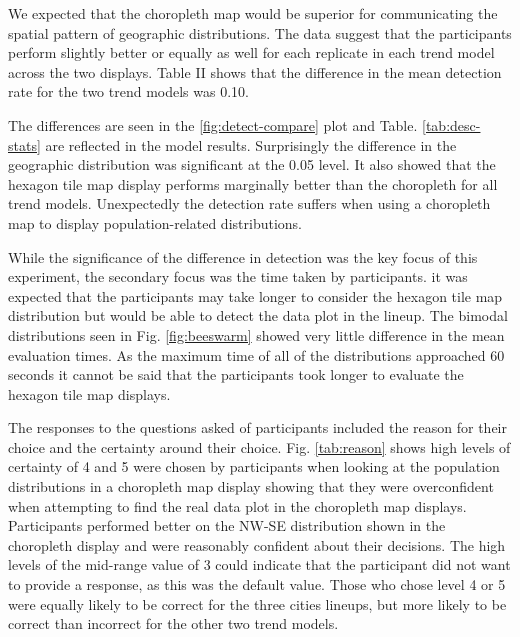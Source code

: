 \documentclass[journal]{vgtc}                     %
\begin{document}
We expected that the choropleth map would be superior for communicating the spatial pattern of geographic distributions. The data suggest that the participants perform slightly better or equally as well for each replicate in each trend model across the two displays. Table II shows that the difference in the mean detection rate for the two trend models was 0.10.

The differences are seen in the \ref{fig:detect-compare} plot and Table. \ref{tab:desc-stats} are reflected in the model results. Surprisingly the difference in the geographic distribution was significant at the 0.05 level.
It also showed that the hexagon tile map display performs marginally better than the choropleth for all trend models. Unexpectedly the detection rate suffers when using a choropleth map to display population-related distributions.

While the significance of the difference in detection was the key focus of this experiment, the secondary focus was the time taken by participants. it was expected that the participants may take longer to consider the hexagon tile map distribution but would be able to detect the data plot in the lineup.
The bimodal distributions seen in Fig. \ref{fig:beeswarm} showed very little difference in the mean evaluation times. As the maximum time of all of the distributions approached 60 seconds it cannot be said that the participants took longer to evaluate the hexagon tile map displays.

The responses to the questions asked of participants included the reason for their choice and the certainty around their choice.
Fig. \ref{tab:reason} shows high levels of certainty of 4 and 5 were chosen by participants when looking at the population distributions in a choropleth map display showing that they were overconfident when attempting to find the real data plot in the choropleth map displays. Participants performed better on the NW-SE distribution shown in the choropleth display and were reasonably confident about their decisions.
The high levels of the mid-range value of 3 could indicate that the participant did not want to provide a response, as this was the default value. Those who chose level 4 or 5 were equally likely to be correct for the three cities lineups, but more likely to be correct than incorrect for the other two trend models.
\end{document}
